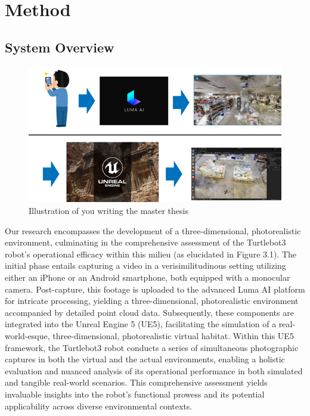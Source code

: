 \chapter{Method}
\label{chap:Method}
\section{System Overview}
\label{sec:system_overview}

\begin{figure}[htbp]
  \includegraphics[scale=0.9]{./Figure/画像16.png}
  \caption{Illustration of you writing the master thesis}
  \label{fig:itai}
\end{figure}
\singlespacing
Our research encompasses the development of a three-dimensional, photorealistic environment, culminating in the comprehensive assessment of the Turtlebot3 robot's operational efficacy within this milieu (as elucidated in Figure 3.1). The initial phase entails capturing a video in a verisimilitudinous setting utilizing either an iPhone or an Android smartphone, both equipped with a monocular camera. Post-capture, this footage is uploaded to the advanced Luma AI platform for intricate processing, yielding a three-dimensional, photorealistic environment accompanied by detailed point cloud data. Subsequently, these components are integrated into the Unreal Engine 5 (UE5), facilitating the simulation of a real-world-esque, three-dimensional, photorealistic virtual habitat. Within this UE5 framework, the Turtlebot3 robot conducts a series of simultaneous photographic captures in both the virtual and the actual environments, enabling a holistic evaluation and nuanced analysis of its operational performance in both simulated and tangible real-world scenarios. This comprehensive assessment yields invaluable insights into the robot's functional prowess and its potential applicability across diverse environmental contexts.
